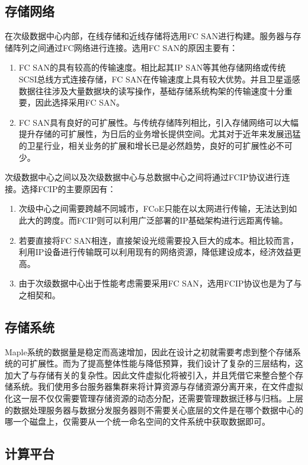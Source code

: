 \documentclass{article}
\begin{document}
\subsection{存储网络}
在次级数据中心内部，在线存储和近线存储将选用FC SAN进行构建。服务器与存储阵列之间通过FC网络进行连接。选用FC SAN的原因主要有：
\begin{enumerate}
\item FC SAN的具有较高的传输速度。相比起其IP SAN等其他存储网络或传统SCSI总线方式连接存储，FC SAN在传输速度上具有较大优势。并且卫星遥感数据往往涉及大量数据块的读写操作，基础存储系统构架的传输速度十分重要，因此选择采用FC SAN。
\item FC SAN具有良好的可扩展性。与传统存储阵列相比，引入存储网络可以大幅提升存储的可扩展性，为日后的业务增长提供空间。尤其对于近年来发展迅猛的卫星行业，相关业务的扩展和增长已是必然趋势，良好的可扩展性必不可少。
\end{enumerate}

次级数据中心之间以及次级数据中心与总数据中心之间将通过FCIP协议进行连接。选择FCIP的主要原因有：
\begin{enumerate}
\item 次级中心之间需要跨越不同城市，FCoE只能在以太网进行传输，无法达到如此大的跨度。而FCIP则可以利用广泛部署的IP基础架构进行远距离传输。
\item 若要直接将FC SAN相连，直接架设光缆需要投入巨大的成本。相比较而言，利用IP设备进行传输既可以利用现有的网络资源，降低建设成本，经济效益更高。
\item 由于次级数据中心出于性能考虑需要采用FC SAN，选用FCIP协议也是为了与之相契和。
\end{enumerate}

\subsection{存储系统}
Maple系统的数据量是稳定而高速增加，因此在设计之初就需要考虑到整个存储系统的可扩展性。而为了提高整体性能与降低预算，我们设计了复杂的三层结构，这加大了与存储有关的复杂性。因此文件虚拟化将被引入，并且凭借它来整合整个存储系统。我们使用多台服务器集群来将计算资源与存储资源分离开来，在文件虚拟化这一层不仅仅需要管理存储资源的动态分配，还需要管理数据迁移与归档。上层的数据处理服务器与数据分发服务器则不需要关心底层的文件是在哪个数据中心的哪一个磁盘上，仅需要从一个统一命名空间的文件系统中获取数据即可。

\subsection{计算平台}
\end{document}

